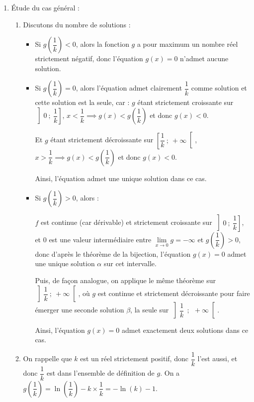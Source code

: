 \documentclass[10pt]{article}
\providecommand{\R}{\mathbb{R}}
\begin{document}
\begin{enumerate}
\begin{enumerate}
\item On en déduit que sur son ensemble de définition, $f$ atteint un maximum égal à $-1$ pour $x = 1$, donc $f$ est à valeurs strictement négatives sur $\R^{*+}$.

Il n'y a donc aucune solution à l'équation $f(x) = 0$, or $f(x) = 0 \iff \ln(x) = x$, donc l'équation $\ln (x) = x$ n'admet aucune solution.
	\end{enumerate}
\item Étude du cas général :
	\begin{enumerate}
		\item Discutons du nombre de solutions :
\begin{itemize}
\item Si $g\left(\dfrac 1k\right)< 0$, alors la fonction $g$ a pour maximum un nombre réel strictement négatif, donc l'équation $g(x) = 0$ n'admet aucune solution.
\item Si $g\left(\dfrac 1k\right)= 0$, alors l'équation admet clairement $\dfrac{1}{k}$ comme solution et cette solution est la seule, car : $g$ étant strictement croissante sur $\left]0~;~\dfrac{1}{k}\right]$, $x < \dfrac{1}{k} \implies g(x) < g\left(\dfrac{1}{k}\right) $ et donc $g(x) < 0$.

Et $g$ étant strictement décroissante sur $\left[\dfrac{1}{k}~;~+\infty\right[$, $x > \dfrac{1}{k} \implies g(x) < g\left(\dfrac{1}{k}\right) $ et donc $g(x) < 0$.

Ainsi, l'équation admet une unique solution dans ce cas.

\item Si $g\left(\dfrac 1k\right)>0$, alors :

$f$ est continue (car dérivable) et strictement croissante sur $\left]0~;~\dfrac{1}{k}\right]$, et $0$ est une valeur intermédiaire entre $\lim\limits_{x \to 0}g = -\infty$ et $g\left(\dfrac{1}{k}\right)>0$, donc d'après le théorème de la bijection, l'équation $g(x) = 0$ admet une unique solution $\alpha$ sur cet intervalle.

Puis, de façon analogue, on applique le même théorème sur $\left]\dfrac{1}{k}~;~+\infty \right[$, où $g$ est continue et strictement décroissante pour faire émerger une seconde solution $\beta$, la seule sur $\left]\dfrac{1}{k}~~;~~+\infty \right[$.

Ainsi, l'équation $g(x) = 0$ admet exactement deux solutions dans ce cas.
\end{itemize}

		\item On rappelle que $k$ est un réel strictement positif, donc $\dfrac{1}{k}$ l'est aussi, et donc $\dfrac{1}{k}$ est dans l'ensemble de définition de $g$. On a $g\left(\dfrac 1k\right) = \ln\left(\dfrac 1k\right) - k\times \dfrac{1}{k} = -\ln(k) - 1$.


\end{enumerate}
\end{enumerate}
\end{document}
